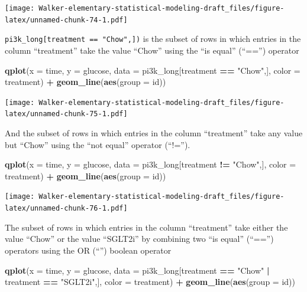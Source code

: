 \documentclass[]{book}
\newenvironment{Shaded}{\begin{snugshade}}{\end{snugshade}}
\newcommand{\DataTypeTok}[1]{\textcolor[rgb]{0.13,0.29,0.53}{#1}}
\newcommand{\KeywordTok}[1]{\textcolor[rgb]{0.13,0.29,0.53}{\textbf{#1}}}
\newcommand{\NormalTok}[1]{#1}
\newcommand{\OperatorTok}[1]{\textcolor[rgb]{0.81,0.36,0.00}{\textbf{#1}}}
\newcommand{\StringTok}[1]{\textcolor[rgb]{0.31,0.60,0.02}{#1}}
\begin{document}
\texttt{[image: Walker-elementary-statistical-modeling-draft\_files/figure-latex/unnamed-chunk-74-1.pdf]}

\texttt{pi3k\_long{[}treatment\ ==\ "Chow",{]})} is the subset of rows in which entries in the column ``treatment'' take the value ``Chow'' using the ``is equal'' (``=='') operator

\begin{Shaded}
\begin{Highlighting}[]
\KeywordTok{qplot}\NormalTok{(}\DataTypeTok{x =}\NormalTok{ time,}
      \DataTypeTok{y =}\NormalTok{ glucose,}
      \DataTypeTok{data =}\NormalTok{ pi3k_long[treatment }\OperatorTok{==}\StringTok{ "Chow"}\NormalTok{,],}
      \DataTypeTok{color =}\NormalTok{ treatment) }\OperatorTok{+}
\StringTok{  }\KeywordTok{geom_line}\NormalTok{(}\KeywordTok{aes}\NormalTok{(}\DataTypeTok{group =}\NormalTok{ id))}
\end{Highlighting}
\end{Shaded}

\texttt{[image: Walker-elementary-statistical-modeling-draft\_files/figure-latex/unnamed-chunk-75-1.pdf]}

And the subset of rows in which entries in the column ``treatment'' take any value but ``Chow'' using the ``not equal'' operator (``!='').

\begin{Shaded}
\begin{Highlighting}[]
\KeywordTok{qplot}\NormalTok{(}\DataTypeTok{x =}\NormalTok{ time,}
      \DataTypeTok{y =}\NormalTok{ glucose,}
      \DataTypeTok{data =}\NormalTok{ pi3k_long[treatment }\OperatorTok{!=}\StringTok{ "Chow"}\NormalTok{,],}
      \DataTypeTok{color =}\NormalTok{ treatment) }\OperatorTok{+}
\StringTok{  }\KeywordTok{geom_line}\NormalTok{(}\KeywordTok{aes}\NormalTok{(}\DataTypeTok{group =}\NormalTok{ id))}
\end{Highlighting}
\end{Shaded}

\texttt{[image: Walker-elementary-statistical-modeling-draft\_files/figure-latex/unnamed-chunk-76-1.pdf]}

The subset of rows in which entries in the column ``treatment'' take either the value ``Chow'' or the value ``SGLT2i'' by combining two ``is equal'' (``=='') operators using the OR (``\textbar{}'') boolean operator

\begin{Shaded}
\begin{Highlighting}[]
\KeywordTok{qplot}\NormalTok{(}\DataTypeTok{x =}\NormalTok{ time,}
      \DataTypeTok{y =}\NormalTok{ glucose,}
      \DataTypeTok{data =}\NormalTok{ pi3k_long[treatment }\OperatorTok{==}\StringTok{ "Chow"} \OperatorTok{|}\StringTok{ }\NormalTok{treatment }\OperatorTok{==}\StringTok{ "SGLT2i"}\NormalTok{,],}
      \DataTypeTok{color =}\NormalTok{ treatment) }\OperatorTok{+}
\StringTok{  }\KeywordTok{geom_line}\NormalTok{(}\KeywordTok{aes}\NormalTok{(}\DataTypeTok{group =}\NormalTok{ id))}
\end{Highlighting}
\end{Shaded}
\end{document}
